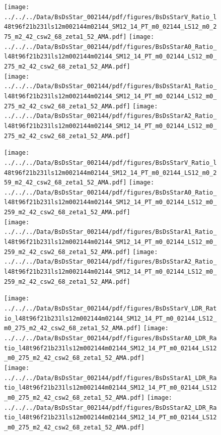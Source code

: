 \documentclass[a4paper,10pt]{article}
\begin{document}
\begin{figure}[p]
 \texttt{[image: ../../../Data/BsDsStar\_002144/pdf/figures/BsDsStarV\_Ratio\_l48t96f21b231ls12m002144m02144\_SM12\_14\_PT\_m0\_02144\_LS12\_m0\_275\_m2\_42\_csw2\_68\_zeta1\_52\_AMA.pdf]}  
\texttt{[image: ../../../Data/BsDsStar\_002144/pdf/figures/BsDsStarA0\_Ratio\_l48t96f21b231ls12m002144m02144\_SM12\_14\_PT\_m0\_02144\_LS12\_m0\_275\_m2\_42\_csw2\_68\_zeta1\_52\_AMA.pdf]} \\ 
\texttt{[image: ../../../Data/BsDsStar\_002144/pdf/figures/BsDsStarA1\_Ratio\_l48t96f21b231ls12m002144m02144\_SM12\_14\_PT\_m0\_02144\_LS12\_m0\_275\_m2\_42\_csw2\_68\_zeta1\_52\_AMA.pdf]}  
\texttt{[image: ../../../Data/BsDsStar\_002144/pdf/figures/BsDsStarA2\_Ratio\_l48t96f21b231ls12m002144m02144\_SM12\_14\_PT\_m0\_02144\_LS12\_m0\_275\_m2\_42\_csw2\_68\_zeta1\_52\_AMA.pdf]} \\ 
\end{figure} 
\clearpage

\begin{figure}[p]
 \texttt{[image: ../../../Data/BsDsStar\_002144/pdf/figures/BsDsStarV\_Ratio\_l48t96f21b231ls12m002144m02144\_SM12\_14\_PT\_m0\_02144\_LS12\_m0\_259\_m2\_42\_csw2\_68\_zeta1\_52\_AMA.pdf]}  
\texttt{[image: ../../../Data/BsDsStar\_002144/pdf/figures/BsDsStarA0\_Ratio\_l48t96f21b231ls12m002144m02144\_SM12\_14\_PT\_m0\_02144\_LS12\_m0\_259\_m2\_42\_csw2\_68\_zeta1\_52\_AMA.pdf]} \\ 
\texttt{[image: ../../../Data/BsDsStar\_002144/pdf/figures/BsDsStarA1\_Ratio\_l48t96f21b231ls12m002144m02144\_SM12\_14\_PT\_m0\_02144\_LS12\_m0\_259\_m2\_42\_csw2\_68\_zeta1\_52\_AMA.pdf]}  
\texttt{[image: ../../../Data/BsDsStar\_002144/pdf/figures/BsDsStarA2\_Ratio\_l48t96f21b231ls12m002144m02144\_SM12\_14\_PT\_m0\_02144\_LS12\_m0\_259\_m2\_42\_csw2\_68\_zeta1\_52\_AMA.pdf]} \\ 
\end{figure} 
\clearpage

\begin{figure}[p]
 \texttt{[image: ../../../Data/BsDsStar\_002144/pdf/figures/BsDsStarV\_LDR\_Ratio\_l48t96f21b231ls12m002144m02144\_SM12\_14\_PT\_m0\_02144\_LS12\_m0\_275\_m2\_42\_csw2\_68\_zeta1\_52\_AMA.pdf]}  
\texttt{[image: ../../../Data/BsDsStar\_002144/pdf/figures/BsDsStarA0\_LDR\_Ratio\_l48t96f21b231ls12m002144m02144\_SM12\_14\_PT\_m0\_02144\_LS12\_m0\_275\_m2\_42\_csw2\_68\_zeta1\_52\_AMA.pdf]} \\ 
\texttt{[image: ../../../Data/BsDsStar\_002144/pdf/figures/BsDsStarA1\_LDR\_Ratio\_l48t96f21b231ls12m002144m02144\_SM12\_14\_PT\_m0\_02144\_LS12\_m0\_275\_m2\_42\_csw2\_68\_zeta1\_52\_AMA.pdf]}  
\texttt{[image: ../../../Data/BsDsStar\_002144/pdf/figures/BsDsStarA2\_LDR\_Ratio\_l48t96f21b231ls12m002144m02144\_SM12\_14\_PT\_m0\_02144\_LS12\_m0\_275\_m2\_42\_csw2\_68\_zeta1\_52\_AMA.pdf]} \\ 
\end{figure} 
\clearpage
\end{document}
